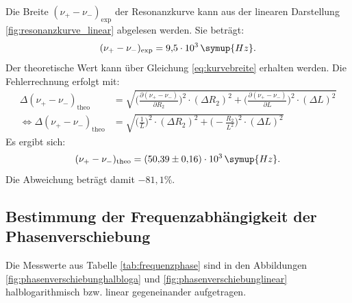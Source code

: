 Die Breite $(\nu_+ - \nu_-)_{\text{exp}}$ der Resonanzkurve kann aus der linearen Darstellung \eqref{fig:resonanzkurve_linear} abgelesen werden. Sie beträgt:
\begin{equation*}
(\nu_+ - \nu_-)_{\text{exp}} = 9{,}5 \cdot 10^{3}\, \symup{Hz}.
\end{equation*}
Der theoretische Wert kann über Gleichung \eqref{eq:kurvebreite} erhalten werden. Die Fehlerrechnung erfolgt mit:
\begin{equation*}
\begin{aligned}
\Delta (\nu_+ - \nu_-)_{\text{theo}} &= \sqrt{\biggl(\frac{\partial (\nu_+ - \nu_-)}{\partial R_2}\biggr)^2\cdot (\Delta R_2)^2 + \biggl(\frac{\partial (\nu_+ - \nu_-)}{\partial L}\biggr)^2\cdot (\Delta L)^2}\\
\iff \Delta (\nu_+ - \nu_-)_{\text{theo}} &= \sqrt{\biggl(\frac{1}{L}\biggr)^2\cdot (\Delta R_2)^2 + \biggl(-\frac{R_2}{L^2}\biggr)^2\cdot (\Delta L)^2}
\end{aligned}
\end{equation*}
Es ergibt sich:
\begin{equation*}
(\nu_+ - \nu_-)_{\text{theo}} = (50{,}39 \pm 0{,}16) \cdot 10^{3}\, \symup{Hz}.
\end{equation*}
Die Abweichung beträgt damit $-81{,}1 \%$.
\newpage
\subsection{Bestimmung der Frequenzabhängigkeit der Phasenverschiebung}

Die Messwerte aus Tabelle \eqref{tab:frequenzphase} sind in den Abbildungen \eqref{fig:phasenverschiebunghalbloga} und \eqref{fig:phasenverschiebunglinear} halblogarithmisch bzw. linear gegeneinander aufgetragen.

